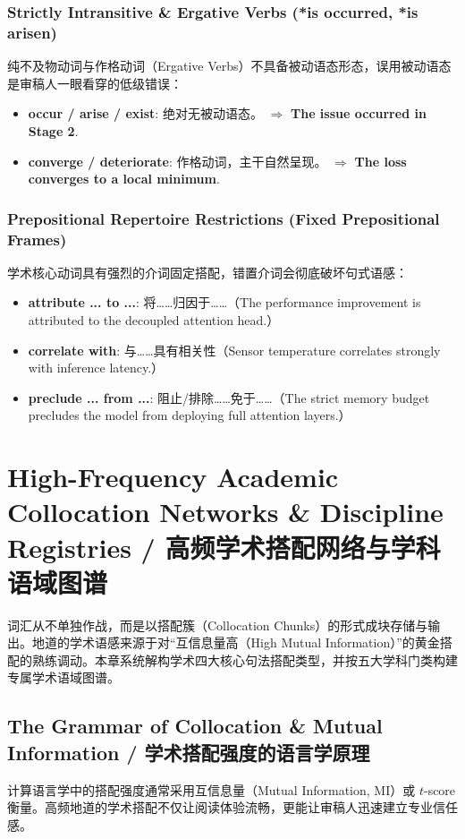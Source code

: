 \subsection{Strictly Intransitive \& Ergative Verbs (*is occurred, *is arisen)}
纯不及物动词与作格动词（Ergative Verbs）不具备被动语态形态，误用被动语态是审稿人一眼看穿的低级错误：
\begin{itemize}[leftmargin=1.5em]
  \item \textbf{occur / arise / exist}: 绝对无被动语态。 $\Longrightarrow$ \textbf{The issue occurred in Stage 2}.
  \item \textbf{converge / deteriorate}: 作格动词，主干自然呈现。 $\Longrightarrow$ \textbf{The loss converges to a local minimum}.
\end{itemize}

\subsection{Prepositional Repertoire Restrictions (Fixed Prepositional Frames)}
学术核心动词具有强烈的介词固定搭配，错置介词会彻底破坏句式语感：
\begin{itemize}[leftmargin=1.5em]
  \item \textbf{attribute ... to ...}: 将……归因于……（The performance improvement is attributed to the decoupled attention head.）
  \item \textbf{correlate with}: 与……具有相关性（Sensor temperature correlates strongly with inference latency.）
  \item \textbf{preclude ... from ...}: 阻止/排除……免于……（The strict memory budget precludes the model from deploying full attention layers.）
\end{itemize}

\chapter{High-Frequency Academic Collocation Networks \& Discipline Registries / 高频学术搭配网络与学科语域图谱}\label{ch:collocations}
词汇从不单独作战，而是以搭配簇（Collocation Chunks）的形式成块存储与输出。地道的学术语感来源于对“互信息量高（High Mutual Information）”的黄金搭配的熟练调动。本章系统解构学术四大核心句法搭配类型，并按五大学科门类构建专属学术语域图谱。

\section{The Grammar of Collocation \& Mutual Information / 学术搭配强度的语言学原理}
计算语言学中的搭配强度通常采用互信息量（Mutual Information, MI）或 $t$-score 衡量。高频地道的学术搭配不仅让阅读体验流畅，更能让审稿人迅速建立专业信任感。

